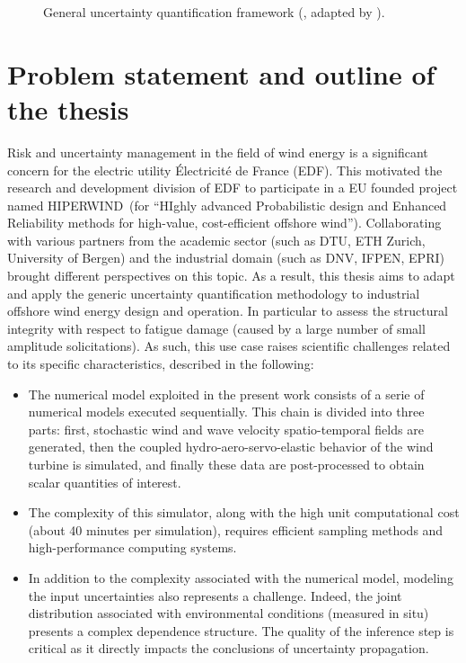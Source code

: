 \begin{figure}[!h]
    \centering
    
    \caption{General uncertainty quantification framework (\citealp{rocquigny_2008}, adapted by \citealp{ajenjo_2023}).}
    \label{fig:UQ_methodo}
\end{figure}


\section*{Problem statement and outline of the thesis}

Risk and uncertainty management in the field of wind energy is a significant concern for the electric utility Électricité de France (EDF). 
This motivated the research and development division of EDF to participate in a EU founded project named HIPERWIND\footnotemark~(for ``HIghly advanced Probabilistic design and Enhanced Reliability methods for high-value, cost-efficient offshore wind''). 
Collaborating with various partners from the academic sector (such as DTU, ETH Zurich, University of Bergen) and the industrial domain (such as DNV, IFPEN, EPRI) brought different perspectives on this topic. 
As a result, this thesis aims to adapt and apply the generic uncertainty quantification methodology to industrial offshore wind energy design and operation. 
In particular to assess the structural integrity with respect to fatigue damage (caused by a large number of small amplitude solicitations). 
As such, this use case raises scientific challenges related to its specific characteristics, described in the following:
\begin{itemize}
    \item The numerical model exploited in the present work consists of a serie of numerical models executed sequentially. 
    This chain is divided into three parts: first, stochastic wind and wave velocity spatio-temporal fields are generated, 
    then the coupled hydro-aero-servo-elastic behavior of the wind turbine is simulated, 
    and finally these data are post-processed to obtain scalar quantities of interest. 
    \item The complexity of this simulator, along with the high unit computational cost (about 40 minutes per simulation), requires efficient sampling methods and high-performance computing systems. 
    \item In addition to the complexity associated with the numerical model, modeling the input uncertainties also represents a challenge. 
    Indeed, the joint distribution associated with environmental conditions (measured in situ) presents a complex dependence structure.   
    The quality of the inference step is critical as it directly impacts the conclusions of uncertainty propagation.
\end{itemize}

